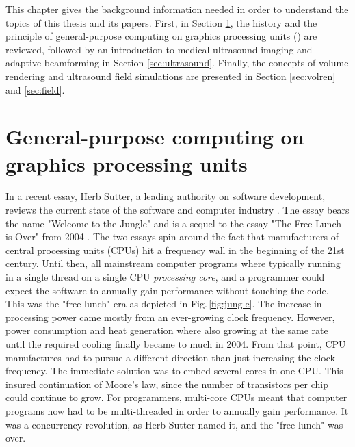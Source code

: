 %

This chapter gives the background information needed in order to understand the topics of this thesis and its papers. First, in Section \ref{sec:gpgpu}, the history and the principle of general-purpose computing on graphics processing units () are reviewed, followed by an introduction to medical ultrasound imaging and adaptive beamforming in Section \ref{sec:ultrasound}. Finally, the concepts of volume rendering and ultrasound field simulations are presented in Section \ref{sec:volren} and \ref{sec:field}.

\section{General-purpose computing on graphics processing units}\label{sec:gpgpu}
In a recent essay, Herb Sutter, a leading authority on software development, reviews the current state of the software and computer industry \cite{HerbSutter}. The essay bears the name "Welcome to the Jungle" and is a sequel to the essay "The Free Lunch is Over" from 2004 \cite{HerbSuttera}. The two essays spin around the fact that manufacturers of central processing units (CPUs) hit a frequency wall in the beginning of the 21st century. Until then, all mainstream computer programs where typically running in a single thread on a single CPU \textit{processing core}, and a programmer could expect the software to annually gain performance without touching the code. This was the "free-lunch"-era as depicted in Fig.\,\ref{fig:jungle}. The increase in processing power came mostly from an ever-growing clock frequency. However, power consumption and heat generation where also growing at the same rate until the required cooling finally became to much in 2004.  From that point, CPU manufactures had to pursue a different direction  than just increasing the clock frequency. The immediate solution was to embed several cores in one CPU. This insured continuation of Moore's law, since the number of transistors per chip could continue to grow. For programmers, multi-core CPUs meant that computer programs now had to be multi-threaded in order to annually gain performance. It was a concurrency revolution, as Herb Sutter named it, and  the "free lunch" was over.

